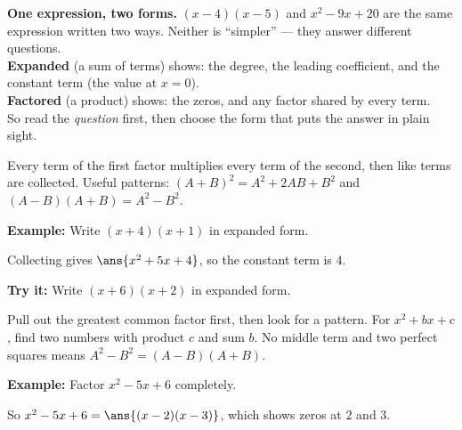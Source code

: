 \documentclass[12pt]{article}
\begin{document}

\begin{formulabox}
\textbf{One expression, two forms.} $(x-4)(x-5)$ and $x^2-9x+20$ are the same
expression written two ways. Neither is ``simpler'' --- they answer different
questions.\\[3pt]
\textbf{Expanded} (a sum of terms) shows: the degree, the leading coefficient,
and the constant term (the value at $x=0$).\\[3pt]
\textbf{Factored} (a product) shows: the zeros, and any factor shared by every
term.\\[3pt]
So read the \emph{question} first, then choose the form that puts the answer in
plain sight.
\end{formulabox}


\begin{formulabox}
Every term of the first factor multiplies every term of the second, then like
terms are collected. Useful patterns:
$(A+B)^2=A^2+2AB+B^2$ and $(A-B)(A+B)=A^2-B^2$.
\end{formulabox}

\begin{examplebox}
\textbf{Example:} Write $(x+4)(x+1)$ in expanded form.

Collecting gives $\ans{x^2+5x+4}$, so the constant term is $4$.
\end{examplebox}

\begin{tryitbox}
\textbf{Try it:} Write $(x+6)(x+2)$ in expanded form.\\[2pt]
\end{tryitbox}


\begin{formulabox}
Pull out the greatest common factor first, then look for a pattern.
For $x^2+bx+c$, find two numbers with product $c$ and sum $b$.
No middle term and two perfect squares means $A^2-B^2=(A-B)(A+B)$.
\end{formulabox}

\begin{examplebox}
\textbf{Example:} Factor $x^2-5x+6$ completely.

So $x^2-5x+6=\ans{(x-2)(x-3)}$, which shows zeros at $2$ and $3$.
\end{examplebox}
\end{document}
